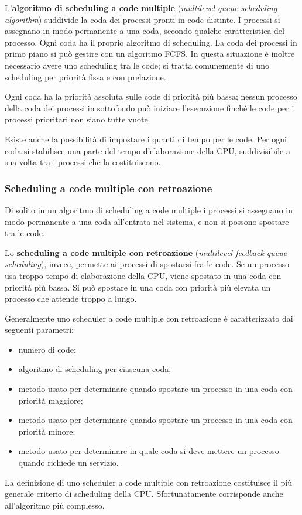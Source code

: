 \documentclass[11pt,a4paper]{article}
\begin{document}
L'\textbf{algoritmo di scheduling a code multiple} (\emph{multilevel queue scheduling algorithm}) sud­divide la coda dei processi pronti in code distinte.
I processi si assegnano in mo­do permanente a una coda, secondo qualche caratteristica del processo. Ogni coda ha il proprio algoritmo di scheduling.
La coda dei processi in primo piano si può gestire con un algoritmo FCFS.
In questa situazione è inoltre necessario avere uno scheduling tra le code; si tratta comune­mente di uno scheduling per priorità fissa e con prelazione.

Ogni coda ha la priorità assoluta sulle code di priorità più bassa; nessun processo della coda
dei processi in sottofondo può iniziare l'esecuzione finché le code per i processi prioritari non siano tutte vuote.

Esiste anche la possibilità di impostare i quanti di tempo per le code. Per ogni coda si
stabilisce una parte del tempo d'elaborazione della CPU, suddivisibile a sua volta tra i pro­cessi che la costituiscono.

\subsubsection{Scheduling a code multiple con retroazione}
Di solito in un algoritmo di scheduling a code multiple i processi si assegnano in modo per­manente a una coda all'entrata nel sistema, e non si possono spostare tra le code.

Lo \textbf{scheduling a code multiple con retroazione} (\emph{multilevel feedback queue scheduling}),
invece, permette ai processi di spostarsi fra le code.
Se un processo usa troppo tempo di elaborazione della CPU, viene spostato in una coda con priorità più bassa. Si può spostare in una coda con priorità più elevata un processo che attende troppo a lungo.

Generalmente uno scheduler a code multiple con retroazione è caratterizzato dai se­guenti parametri:
\begin{itemize}
  \item numero di code;
  \item algoritmo di scheduling per ciascuna coda;
  \item metodo usato per determinare quando spostare un processo in una coda con priorità maggiore;
  \item metodo usato per determinare quando spostare un processo in una coda con priorità minore;
  \item metodo usato per determinare in quale coda si deve mettere un processo quando ri­chiede un servizio.
\end{itemize}
%
La definizione di uno scheduler a code multiple con retroazione costituisce il più generale
criterio di scheduling della CPU. Sfortunatamente corrisponde anche all'algoritmo più complesso.
\end{document}
